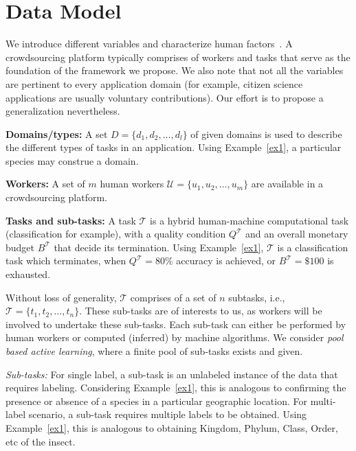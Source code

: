 \vspace{-0.2in}
\section{Data Model}\label{dm}
\vspace{-0.1in}
We introduce different variables and characterize human factors~\cite{hf1,motiv00,motiv0,motiv1,motiv2,motiv3,motiv4}. A crowdsourcing platform typically comprises of workers and tasks that serve as the foundation of the framework we propose. We also note that not all the variables are pertinent to every application domain (for example, citizen science applications are usually voluntary contributions). Our effort is to propose a generalization nevertheless. 

{\bf Domains/types:} A set $D=\{d_1,d_2,\ldots,d_{l}\}$  of given domains is used to describe the different types of tasks in an application. Using Example~\ref{ex1}, a particular species may construe a domain. 

{\bf Workers:} A set of $m$ human workers $\mathcal{U}=\{u_1,u_2,\ldots,u_m\}$ are available in a crowdsourcing platform.

{\bf Tasks and sub-tasks:} A task $\mathcal{T}$ is a hybrid human-machine computational task (classification for example), with a quality condition $Q^\mathcal{T}$  and an overall monetary budget $B^\mathcal{T}$ that decide its termination. Using Example~\ref{ex1}, $\mathcal{T}$ is a classification task which terminates, when $Q^\mathcal{T} = 80\%$ accuracy is achieved, or $B^\mathcal{T} =\$100$ is exhausted.

Without loss of generality, $\mathcal{T}$  comprises of a set of $n$ subtasks, i.e., $\mathcal{T} =\{t_1,t_2,\ldots,t_n\}$. These sub-tasks are of interests to us,  as workers will be involved to undertake these sub-tasks. Each sub-task can either be performed by human workers or computed (inferred) by machine algorithms. We consider {\em pool based active learning}, where a finite pool of sub-tasks exists and given.

{\em Sub-tasks:}
For single label, a sub-task is an unlabeled instance of the data that requires labeling. Considering Example~\ref{ex1}, this is analogous to confirming the presence or absence of a species in a particular geographic location. 
For multi-label scenario, a sub-task requires multiple labels to be obtained. Using Example~\ref{ex1}, this is analogous to obtaining Kingdom, Phylum, Class, Order, etc of the insect.

